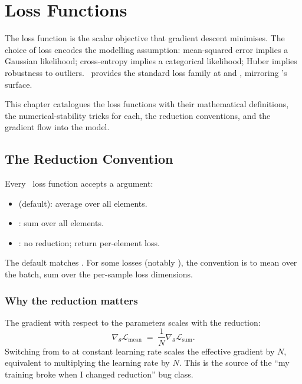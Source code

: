 \chapter{Loss Functions}
\label{ch:losses}

The loss function is the scalar objective that gradient descent
minimises. The choice of loss encodes the modelling assumption:
mean-squared error implies a Gaussian likelihood; cross-entropy
implies a categorical likelihood; Huber implies robustness to
outliers. \Lucid\ provides the standard loss family at
 and , mirroring
's surface.

This chapter catalogues the loss functions with their
mathematical definitions, the numerical-stability tricks for
each, the reduction conventions, and the gradient flow into the
model.

\section{The Reduction Convention}
\label{sec:losses:reduction}

Every \Lucid\ loss function accepts a  argument:

\begin{itemize}
  \item {} (default): average over all elements.
  \item {}: sum over all elements.
  \item {}: no reduction; return per-element loss.
\end{itemize}

The  default matches . For some losses
(notably ), the convention is to mean over
the batch, sum over the per-sample loss dimensions.

\subsection{Why the reduction matters}
\label{ssec:losses:why_reduction}

The gradient with respect to the parameters scales with the
reduction:
\[
\nabla_\theta \mathcal{L}_{\text{mean}} \;=\; \frac{1}{N} \nabla_\theta \mathcal{L}_{\text{sum}}.
\]
Switching from  to  at constant learning
rate scales the effective gradient by $N$, equivalent to
multiplying the learning rate by $N$. This is the source of the
``my training broke when I changed reduction'' bug class.

